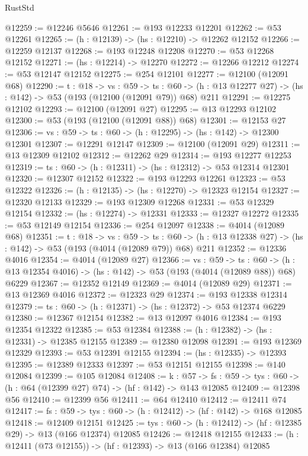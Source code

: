 \begin{lexlean}{RustStd}
\begin{coremodule}
@12259 := @12246 @5646
@12261 := @193 @12233 @12201
@12262 := @53 @12261
@12265 := (h : @12139) -> (hs : @12210) -> @12262 @12152
@12266 := @12259 @12137
@12268 := @193 @12248 @12208
@12270 := @53 @12268 @12152
@12271 := (hs : @12214) -> @12270
@12272 := @12266 @12212
@12274 := @53 @12147 @12152
@12275 := @254 @12101
@12277 := @12100 (@12091 @68)
@12290 := {t : @18} ->
  {vs : @59} ->
  {ts : @60} -> (h : @13 @12277 @27) -> (hs : @142) -> @53 (@193 (@12100 (@12091 @79)) @68) @211
@12291 := @12275 @12102
@12293 := @12100 (@12091 @27)
@12295 := @13 @12293 @12102
@12300 := @53 (@193 (@12100 (@12091 @88)) @68)
@12301 := @12153 @27
@12306 := {vs : @59} -> {ts : @60} -> (h : @12295) -> (hs : @142) -> @12300 @12301
@12307 := @12291 @12147
@12309 := @12100 (@12091 @29)
@12311 := @13 @12309 @12102
@12312 := @12262 @29
@12314 := @193 @12277 @12253
@12319 := {ts : @60} -> (h : @12311) -> (hs : @12312) -> @53 @12314 @12301
@12320 := @12307 @12152
@12322 := @193 @12293 @12261
@12323 := @53 @12322
@12326 := (h : @12135) -> (hs : @12270) -> @12323 @12154
@12327 := @12320 @12133
@12329 := @193 @12309 @12268
@12331 := @53 @12329 @12154
@12332 := (hs : @12274) -> @12331
@12333 := @12327 @12272
@12335 := @53 @12149 @12154
@12336 := @254 @12097
@12338 := @4014 (@12089 @68)
@12351 := {t : @18} ->
  {vs : @59} ->
  {ts : @60} -> (h : @13 @12338 @27) -> (hs : @142) -> @53 (@193 (@4014 (@12089 @79)) @68) @211
@12352 := @12336 @4016
@12354 := @4014 (@12089 @27)
@12366 := {vs : @59} ->
  {ts : @60} -> (h : @13 @12354 @4016) -> (hs : @142) -> @53 (@193 (@4014 (@12089 @88)) @68) @6229
@12367 := @12352 @12149
@12369 := @4014 (@12089 @29)
@12371 := @13 @12369 @4016
@12372 := @12323 @29
@12374 := @193 @12338 @12314
@12379 := {ts : @60} -> (h : @12371) -> (hs : @12372) -> @53 @12374 @6229
@12380 := @12367 @12154
@12382 := @13 @12097 @4016
@12384 := @193 @12354 @12322
@12385 := @53 @12384
@12388 := (h : @12382) -> (hs : @12331) -> @12385 @12155
@12389 := @12380 @12098
@12391 := @193 @12369 @12329
@12393 := @53 @12391 @12155
@12394 := (hs : @12335) -> @12393
@12395 := @12389 @12333
@12397 := @53 @12151 @12155
@12398 := @140 @12084
@12399 := @105 @12084
@12408 := {k : @57} ->
  {fs : @59} -> {tys : @60} -> (h : @64 (@12399 @27) @74) -> (hf : @142) -> @143 @12085
@12409 := @12398 @56
@12410 := @12399 @56
@12411 := @64 @12410
@12412 := @12411 @74
@12417 := {fs : @59} -> {tys : @60} -> (h : @12412) -> (hf : @142) -> @168 @12085
@12418 := @12409 @12151
@12425 := {tys : @60} -> (h : @12412) -> (hf : @12385 @29) -> @13 (@166 @12374) @12085
@12426 := @12418 @12155
@12433 := (h : @12411 (@73 @12155)) -> (hf : @12393) -> @13 (@166 @12384) @12085

\end{coremodule}
\end{lexlean}
